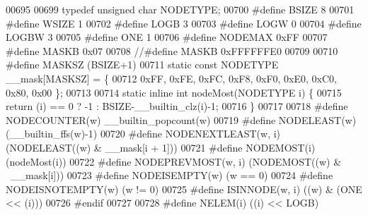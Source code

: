 \begin{DoxyCode}
00695 
00699 \textcolor{keyword}{typedef} \textcolor{keywordtype}{unsigned} \textcolor{keywordtype}{char} NODETYPE;                         
00700 \textcolor{preprocessor}{#define BSIZE 8                                                         }
00701 \textcolor{preprocessor}{#define WSIZE 1                                                         }
00702 \textcolor{preprocessor}{#define LOGB 3                                                          }
00703 \textcolor{preprocessor}{#define LOGW 0                                                          }
00704 \textcolor{preprocessor}{#define LOGBW 3                                                         }
00705 \textcolor{preprocessor}{#define ONE 1                                                           }
00706 \textcolor{preprocessor}{#define NODEMAX 0xFF                                            }
00707 \textcolor{preprocessor}{#define MASKB 0x07                                                      }
00708 \textcolor{preprocessor}{//#define MASKB 0xFFFFFFE0}
00709 
00710 \textcolor{preprocessor}{#define MASKSZ (BSIZE+1)                                        }
00711 \textcolor{preprocessor}{static const NODETYPE \_\_mask[MASKSZ] = \{ }
00712 \textcolor{preprocessor}{                0xFF, 0xFE, 0xFC, 0xF8, 0xF0, 0xE0, 0xC0, 0x80, 0x00 \};}
00713 
00714 \textcolor{keyword}{static} \textcolor{keyword}{inline} \textcolor{keywordtype}{int} nodeMost(NODETYPE i) \{
00715         \textcolor{keywordflow}{return} (i) == 0 ? -1 : BSIZE-\_\_builtin\_clz(i)-1;
00716 \}
00717 
00718 \textcolor{preprocessor}{#define NODECOUNTER(w) \_\_builtin\_popcount(w)                                            }
00719 \textcolor{preprocessor}{#define NODELEAST(w) (\_\_builtin\_ffs(w)-1)                                                       }
00720 \textcolor{preprocessor}{#define NODENEXTLEAST(w, i) (NODELEAST((w) & \_\_mask[i + 1]))            }
00721 \textcolor{preprocessor}{#define NODEMOST(i) (nodeMost(i))                                                                       }
00722 \textcolor{preprocessor}{#define NODEPREVMOST(w, i) (NODEMOST((w) & ~\_\_mask[i]))                         }
00723 \textcolor{preprocessor}{#define NODEISEMPTY(w) (w == 0)}
00724 \textcolor{preprocessor}{#define NODEISNOTEMPTY(w) (w != 0)}
00725 \textcolor{preprocessor}{#define ISINNODE(w, i) ((w) & (ONE << (i)))                                                     }
00726 \textcolor{preprocessor}{#endif}
00727 
00728 \textcolor{preprocessor}{#define NELEM(i) ((i) << LOGB)                                                                          }

\end{DoxyCode}
